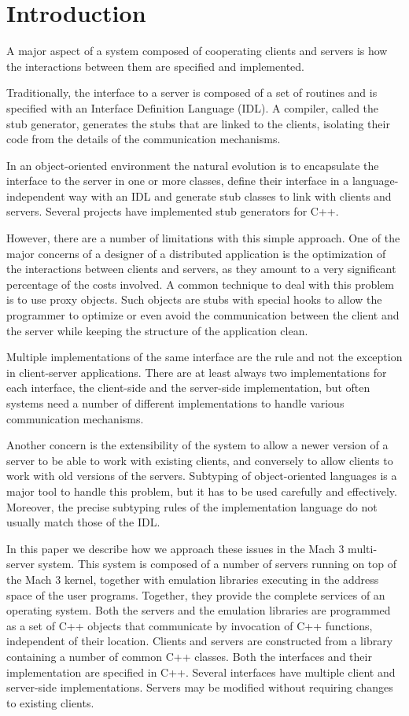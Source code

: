 \section{Introduction}
A major aspect of a system composed of cooperating clients and servers
is how the interactions between them are specified and implemented.

Traditionally, the interface to a server is composed of a set of
routines and is specified with an Interface Definition Language (IDL).
A compiler, called the stub generator, generates the stubs that are
linked to the clients, isolating their code from the details of the
communication mechanisms.

In an object-oriented environment the
natural evolution is to encapsulate the interface to the server in one
or more classes, define their interface in a language-independent
way with an IDL and generate stub classes to link with clients and
servers. Several projects have implemented stub generators for
C++\cite{distc++,arjuna}.

However, there are a number of limitations with this simple approach.
One of the major concerns of a designer of a distributed application
is the optimization of the interactions between clients and servers,
as they amount to a very significant percentage of the costs
involved. A common technique to deal with this problem is to use proxy
objects\cite{sos}. Such objects are stubs with special hooks to
allow the programmer to optimize or even avoid the communication
between the client and the server while keeping the structure
of the application clean. 

Multiple implementations of the same interface are the rule and not
the exception in client-server applications. There are at least
always two implementations for each interface, the client-side and the
server-side implementation, but often systems need a number of
different implementations to handle various communication mechanisms.

Another concern is the extensibility of the system
to allow a newer version of a server to be able to work with
existing clients, and conversely to allow clients to work with
old versions of the servers. Subtyping of 
object-oriented languages is a major tool to handle this problem, but
it has to be used carefully and effectively. Moreover, the
precise subtyping rules of the implementation language do not usually match
those of the IDL.

In this paper we describe how we approach these issues in the Mach 3
multi-server system\cite{multiserver}. This system is composed of a
number of servers running on top of the Mach 3 kernel, together
with emulation libraries executing in the address space of the user
programs. Together, they provide the complete services of an operating
system. Both the servers and the emulation libraries are programmed as
a set of C++ objects that communicate by invocation of C++ functions,
independent of their location. Clients and servers are
constructed from a library containing a number of common C++
classes. Both the
interfaces and their implementation are specified in C++. Several
interfaces have multiple client and server-side implementations.
Servers may be modified without requiring changes to existing clients.

